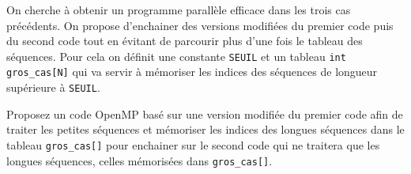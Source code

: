 \documentclass[A4wide]{article}
\begin{document}
\begin{question}
  On cherche à obtenir un programme parallèle efficace dans les
  trois cas précédents. On propose d'enchainer des versions
  modifiées du premier code puis du second code tout en évitant de parcourir
  plus d'une fois le tableau des séquences.
    Pour cela on définit une constante \verb#SEUIL# et un tableau
  \verb#int gros_cas[N]# qui va servir à mémoriser les indices des
  séquences de longueur supérieure à \verb#SEUIL#. 

Proposez un code OpenMP basé sur une version modifiée du
premier code afin de traiter les petites séquences et mémoriser
les indices des longues séquences dans le tableau \verb#gros_cas[]# pour enchainer sur le second code
qui ne traitera que les longues séquences, celles
mémorisées dans \verb#gros_cas[]#.
\end{question}
\end{document}
